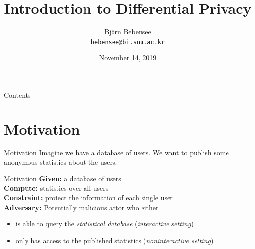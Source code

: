 \documentclass[aspectratio=43]{beamer}
\title{Introduction to Differential Privacy}
\date{November 14, 2019}
\author[Bj\"orn Bebensee]{Bj\"orn Bebensee \\ {\tt bebensee@bi.snu.ac.kr}}
\institute[Seoul National University]{{\normalsize Seoul National University}}
\begin{document}

\begin{frame}
\titlepage
\end{frame}


\begin{frame}{Contents}
    \tableofcontents
\end{frame}


\section{Motivation}

\begin{frame}{Motivation}
    Imagine we have a database of users. We want to publish some anonymous statistics about the users.\\
\end{frame}


\begin{frame}{Motivation}
    \textbf{Given:} a database of users\\
    \smallskip
    \textbf{Compute:} statistics over all users\\
    \smallskip
    \textbf{Constraint:} protect the information of each single user\\
    \bigskip
    \textbf{Adversary:} Potentially malicious actor who either
    \begin{itemize}
        \item is able to query the \emph{statistical database} (\emph{interactive setting})
        \item only has access to the published statistics (\emph{noninteractive setting})
    \end{itemize}
\end{frame}

\end{document}
